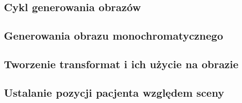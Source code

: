 

\subsection{Cykl generowania obrazów}


\subsection{Generowania obrazu monochromatycznego}


\subsection{Tworzenie transformat i ich użycie na obrazie}


\subsection{Ustalanie pozycji pacjenta względem sceny}
